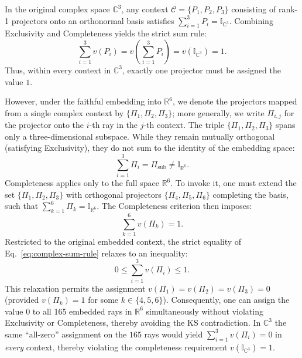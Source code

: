\documentclass[%
  reprint,
  superscriptaddress,
  amsmath,amssymb,
  pra,
  floatfix,
  longbibliography
]{revtex4-2}
\begin{document}
In the original complex space $\mathbb{C}^3$, any context $\mathcal{C} = \{ P_1, P_2, P_3 \}$ consisting of rank-1 projectors onto an orthonormal basis satisfies $\sum_{i=1}^3 P_i = \mathbb{I}_{\mathbb{C}^3}$. Combining Exclusivity and Completeness yields the strict sum rule:
\begin{equation}
    \sum_{i=1}^3 v(P_i) = v\left( \sum_{i=1}^3 P_i \right) = v(\mathbb{I}_{\mathbb{C}^3}) = 1.
    \label{eq:complex-sum-rule}
\end{equation}
Thus, within every context in $\mathbb{C}^3$, exactly one projector must be assigned the value $1$.

However, under the faithful embedding into $\mathbb{R}^6$, we denote the
projectors mapped from a single complex context by
$\{\Pi_1,\Pi_2,\Pi_3\}$; more generally, we write $\Pi_{i,j}$ for the
projector onto the $i$-th ray in the $j$-th context. The triple
$\{\Pi_1,\Pi_2,\Pi_3\}$ spans only a three-dimensional subspace.
While they remain mutually orthogonal (satisfying Exclusivity), they do not sum to the identity of the embedding space:
\begin{equation}
    \sum_{i=1}^3 \Pi_i = \Pi_{\text{sub}} \neq \mathbb{I}_{\mathbb{R}^6}.
\end{equation}
Completeness applies only to the full space $\mathbb{R}^6$. To invoke it, one must extend the set $\{ \Pi_1, \Pi_2, \Pi_3 \}$ with orthogonal projectors $\{ \Pi_4, \Pi_5, \Pi_6 \}$ completing the basis, such that $\sum_{k=1}^6 \Pi_k = \mathbb{I}_{\mathbb{R}^6}$. The Completeness criterion then imposes:
\begin{equation}
    \sum_{k=1}^6 v(\Pi_k) = 1.
\end{equation}
Restricted to the original embedded context, the strict equality of Eq.~\eqref{eq:complex-sum-rule} relaxes to an inequality:
\begin{equation}
    0 \leq \sum_{i=1}^3 v(\Pi_i) \leq 1.
    \label{eq:relaxed-sum}
\end{equation}
This relaxation permits the assignment $v(\Pi_1)=v(\Pi_2)=v(\Pi_3)=0$ (provided $v(\Pi_k)=1$ for some $k \in \{4,5,6\}$). Consequently, one can assign the value $0$ to all 165 embedded rays in $\mathbb{R}^6$ simultaneously without violating Exclusivity or Completeness, thereby avoiding the KS contradiction.
In $\mathbb{C}^3$ the same ``all-zero'' assignment on the $165$ rays would yield
$\sum_{i=1}^3 v(\Pi_i)=0$ in \emph{every} context, thereby violating the completeness
requirement $v(\mathbb{I}_{\mathbb{C}^3})=1$.
\end{document}
